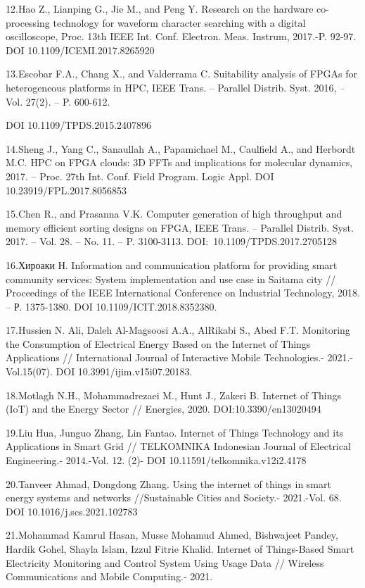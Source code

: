 12.Hao Z., Lianping G., Jie M., and Peng Y. Research on the hardware
co-processing technology for waveform character searching with a digital
oscilloscope, Proc. 13th IEEE Int. Conf. Electron. Meas. Instrum,
2017.-P. 92-97. DOI 10.1109/ICEMI.2017.8265920

13.Escobar F.A., Chang X., and Valderrama C. Suitability analysis of
FPGAs for heterogeneous platforms in HPC, IEEE Trans. -- Parallel
Distrib. Syst. 2016, -- Vol. 27(2). -- P. 600-612.

DOI 10.1109/TPDS.2015.2407896

14.Sheng J., Yang C., Sanaullah A., Papamichael M., Caulfield A., and
Herbordt M.C. HPC on FPGA clouds: 3D FFTs and implications for molecular
dynamics, 2017. -- Proc. 27th Int. Conf. Field Program. Logic Appl. DOI
10.23919/FPL.2017.8056853

15.Chen R., and Prasanna V.K. Computer generation of high throughput and
memory efficient sorting designs on FPGA, IEEE Trans. -- Parallel
Distrib. Syst. 2017. -- Vol. 28. -- No. 11. -- P. 3100-3113.
DOI:~10.1109/TPDS.2017.2705128

16.Хироаки Н. Information and communication platform for providing smart
community services: System implementation and use case in Saitama city
// Proceedings of the IEEE International Conference on Industrial
Technology, 2018. -- Р. 1375-1380. DOI 10.1109/ICIT.2018.8352380.

17.Hussien N. Ali, Daleh Al-Magsoosi A.A., AlRikabi S., Abed F.T.
Monitoring the Consumption of Electrical Energy Based on the Internet of
Things Applications // International Journal of Interactive Mobile
Technologies.- 2021.-Vol.15(07). DOI 10.3991/ijim.v15i07.20183.

18.Motlagh N.H., Mohammadrezaei M., Hunt J., Zakeri B. Internet of
Things (IoT) and the Energy Sector // Energies, 2020.
DOI:10.3390/en13020494

19.Liu Hua, Junguo Zhang, Lin Fantao. Internet of Things Technology and
its Applications in Smart Grid // TELKOMNIKA Indonesian Journal of
Electrical Engineering.- 2014.-Vol. 12. (2)- DOI
10.11591/telkomnika.v12i2.4178

20.Tanveer Ahmad, Dongdong Zhang. Using the internet of things in smart
energy systems and networks //Sustainable Cities and Society.-
2021.-Vol. 68. DOI 10.1016/j.scs.2021.102783

21.Mohammad Kamrul Hasan, Musse Mohamud Ahmed, Bishwajeet Pandey, Hardik
Gohel, Shayla Islam, Izzul Fitrie Khalid. Internet of Things-Based Smart
Electricity Monitoring and Control System Using Usage Data // Wireless
Communications and Mobile Computing.- 2021.

